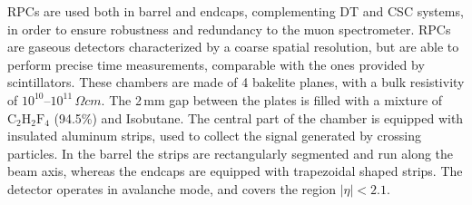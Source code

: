 RPCs are used both in barrel and endcaps, complementing DT and CSC systems, in order to ensure robustness and redundancy to the muon spectrometer.
RPCs are gaseous detectors characterized by a coarse spatial resolution, but are able to perform precise time measurements, comparable with the ones provided by scintillators. These chambers are made of 4 bakelite planes, with a bulk resistivity of $10^{10}\mbox{--}10^{11}\,\Omega cm$. The 2\,mm gap between the plates is filled with a mixture of $\mathrm{C_2 H_2 F_4}$ (94.5\%) and Isobutane. 
The central part of the chamber is equipped with insulated aluminum strips, used to collect the signal generated by crossing particles. In the barrel the strips are rectangularly segmented and run along the beam axis, whereas the endcaps are equipped with trapezoidal shaped strips. The detector operates in avalanche mode, and covers the region $|\eta|<2.1$.

